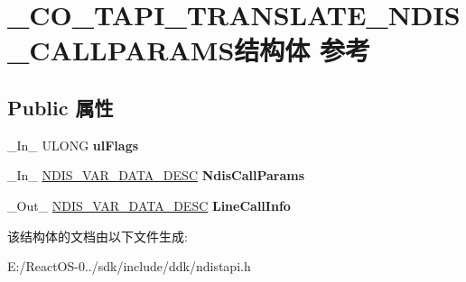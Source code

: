 \hypertarget{struct___c_o___t_a_p_i___t_r_a_n_s_l_a_t_e___n_d_i_s___c_a_l_l_p_a_r_a_m_s}{}\section{\+\_\+\+C\+O\+\_\+\+T\+A\+P\+I\+\_\+\+T\+R\+A\+N\+S\+L\+A\+T\+E\+\_\+\+N\+D\+I\+S\+\_\+\+C\+A\+L\+L\+P\+A\+R\+A\+M\+S结构体 参考}
\label{struct___c_o___t_a_p_i___t_r_a_n_s_l_a_t_e___n_d_i_s___c_a_l_l_p_a_r_a_m_s}
\subsection*{Public 属性}
\begin{DoxyCompactItemize}
\item 
\mbox{\label{struct___c_o___t_a_p_i___t_r_a_n_s_l_a_t_e___n_d_i_s___c_a_l_l_p_a_r_a_m_s_a9acc1cc6087f47d190670852f47f087b}} 
\+\_\+\+In\+\_\+ U\+L\+O\+NG {\bfseries ul\+Flags}
\item 
\mbox{\label{struct___c_o___t_a_p_i___t_r_a_n_s_l_a_t_e___n_d_i_s___c_a_l_l_p_a_r_a_m_s_aee375f0449c11285298d3e27b58eaa31}} 
\+\_\+\+In\+\_\+ \hyperlink{struct___n_d_i_s___v_a_r___d_a_t_a___d_e_s_c}{N\+D\+I\+S\+\_\+\+V\+A\+R\+\_\+\+D\+A\+T\+A\+\_\+\+D\+E\+SC} {\bfseries Ndis\+Call\+Params}
\item 
\mbox{\label{struct___c_o___t_a_p_i___t_r_a_n_s_l_a_t_e___n_d_i_s___c_a_l_l_p_a_r_a_m_s_a057733f79e630e926dec559548369949}} 
\+\_\+\+Out\+\_\+ \hyperlink{struct___n_d_i_s___v_a_r___d_a_t_a___d_e_s_c}{N\+D\+I\+S\+\_\+\+V\+A\+R\+\_\+\+D\+A\+T\+A\+\_\+\+D\+E\+SC} {\bfseries Line\+Call\+Info}
\end{DoxyCompactItemize}


该结构体的文档由以下文件生成\+:\begin{DoxyCompactItemize}
\item 
E\+:/\+React\+O\+S-\/0../sdk/include/ddk/ndistapi.\+h\end{DoxyCompactItemize}

